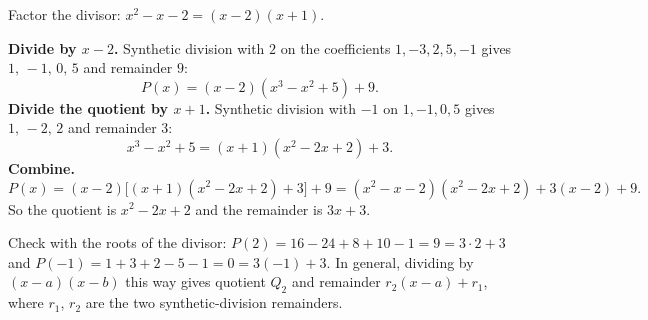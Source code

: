 Factor the divisor: $x^2-x-2=(x-2)(x+1)$.

\textbf{Divide by $x-2$.} Synthetic division with $2$ on the coefficients $1,-3,2,5,-1$ gives $1,\,-1,\,0,\,5$ and remainder $9$:
\[
P(x)=(x-2)(x^3-x^2+5)+9 .
\]
\textbf{Divide the quotient by $x+1$.} Synthetic division with $-1$ on $1,-1,0,5$ gives $1,\,-2,\,2$ and remainder $3$:
\[
x^3-x^2+5=(x+1)(x^2-2x+2)+3 .
\]
\textbf{Combine.}
\[
P(x)=(x-2)\bigl[(x+1)(x^2-2x+2)+3\bigr]+9=(x^2-x-2)(x^2-2x+2)+3(x-2)+9 .
\]
So the quotient is $\boxed{x^2-2x+2}$ and the remainder is $\boxed{3x+3}$.

Check with the roots of the divisor: $P(2)=16-24+8+10-1=9=3\cdot2+3$ and $P(-1)=1+3+2-5-1=0=3(-1)+3$. In general, dividing by $(x-a)(x-b)$ this way gives quotient $Q_2$ and remainder $r_2(x-a)+r_1$, where $r_1$, $r_2$ are the two synthetic-division remainders.
